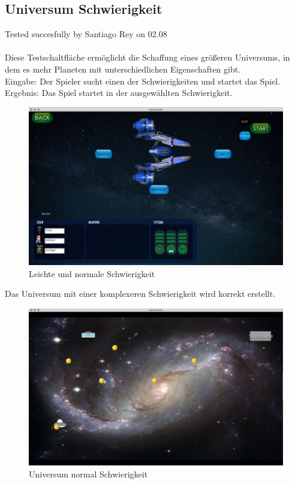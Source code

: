 \documentclass[12pt]{article}
\begin{document}
\subsection{Universum Schwierigkeit}
Tested succesfully by Santiago Rey on 02.08\\\\
Diese Testschaltfläche ermöglicht die Schaffung eines größeren Universums, in dem es mehr Planeten mit unterschiedlichen Eigenschaften gibt.\\
Eingabe: Der Spieler sucht einen der Schwierigkeiten und startet das Spiel.\\
Ergebnis: Das Spiel startet in der ausgewählten Schwierigkeit.
\begin{figure}
\centering
\includegraphics[scale=0.4]{TestProtocolBilder/universeButon.jpg}
\caption{Leichte und normale Schwierigkeit}
\end{figure}

\newpage
Das Universum mit einer komplexeren Schwierigkeit wird korrekt erstellt.\\

\begin{figure}[t]
\centering
\includegraphics[scale=0.4]{TestProtocolBilder/universeHard.jpg}
\caption{Universum normal Schwierigkeit}
\end{figure}
\end{document}
